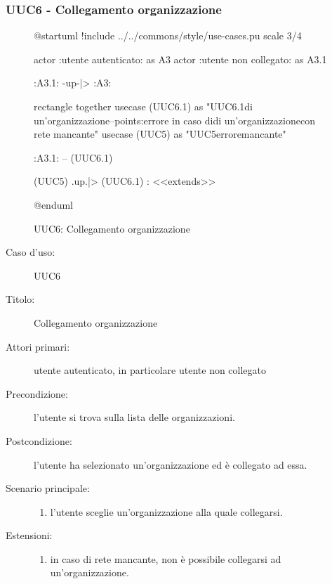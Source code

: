 \documentclass[casi-duso]{subfiles}
\begin{document}
\subsubsection{UUC6 - Collegamento organizzazione}%
\label{subsub:UUC6utente}

\begin{figure}[h!] 
  \centering 
  \begin{plantuml}
  @startuml
  !include ../../commons/style/use-cases.pu
  scale 3/4

  actor :utente autenticato: as A3
  actor :utente non collegato: as A3.1

  :A3.1: -up-|> :A3:

  rectangle {
    together {
      usecase (UUC6.1) as "UUC6.1\nSelezionamento di un'organizzazione\n--\nExtension points:\nVisualizzazione errore in caso di\nselezionamento di un'organizzazione\n con rete mancante"
      usecase (UUC5) as "UUC5\nVisualizzazione errore\nrete mancante"
    }
  }

  :A3.1: -- (UUC6.1)

  (UUC5) .up.|> (UUC6.1) : <<extends>>

  @enduml
  \end{plantuml} 
  \caption{UUC6: Collegamento organizzazione} 
  \label{fig:uuc6} 
\end{figure}

\begin{description}
  \item[Caso d’uso:] UUC6
  \item[Titolo:] Collegamento organizzazione
  \item[Attori primari:] utente autenticato, in particolare utente non collegato
  \item[Precondizione:] l'utente si trova sulla lista delle organizzazioni.
  \item[Postcondizione:] l'utente ha selezionato un'organizzazione ed è collegato ad essa.
  \item[Scenario principale:]
        \begin{enumerate}
          \item l'utente sceglie un'organizzazione alla quale collegarsi.
        \end{enumerate}
  \item[Estensioni:]
        \begin{enumerate}
          \item in caso di rete mancante, non è possibile collegarsi ad un'organizzazione.
        \end{enumerate}
\end{description}
\end{document}

